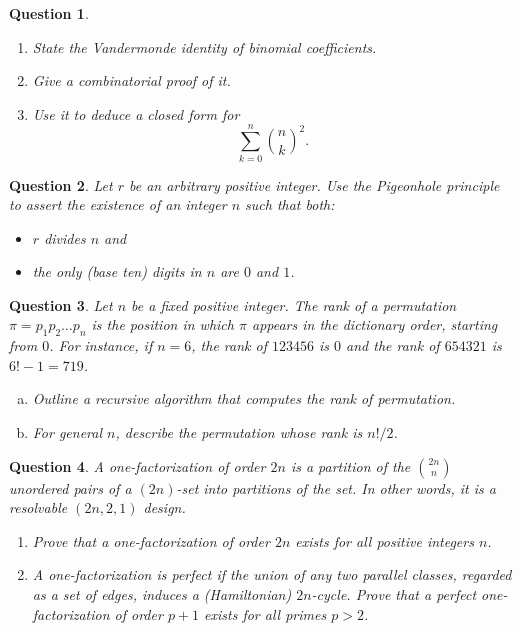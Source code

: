 \documentclass[12]{article}
\newtheorem{question}{Question}
\theoremstyle{definition}
\begin{document}
	\begin{question}
		\
		\begin{enumerate}
			\item State the Vandermonde identity of binomial coefficients.
			\item Give a combinatorial proof of it.
			\item Use it to deduce a closed form for
			$$\sum_{k=0}^n {n \choose k}^2.$$
		\end{enumerate}
	\end{question}

	\begin{question}
		Let $r$ be an arbitrary positive integer.  Use the Pigeonhole principle to assert the existence of an integer $n$ such that both:
		\begin{itemize}
			\item $r$ divides $n$ and
			\item the only (base ten) digits in $n$ are $0$ and $1$.
		\end{itemize}
	\end{question}

	\begin{question}
		Let $n$ be a fixed positive integer.  The rank of a permutation $\pi = p_1p_2\ldots p_n$ is the position in which $\pi$ appears in the dictionary order, starting from $0$.  For instance, if $n=6$, the rank of $123456$ is $0$ and the rank of $654321$ is $6!-1 = 719$.
		\begin{enumerate}[a)]
			\item Outline a recursive algorithm that computes the rank of permutation.
			\item For general $n$, describe the permutation whose rank is $n!/2$.
		\end{enumerate}
	\end{question}

	\begin{question}
		A one-factorization of order $2n$ is a partition of the ${2n \choose n}$ unordered pairs of a $(2n)$-set into partitions of the set.  In other words, it is a resolvable $(2n,2,1)$ design.
		\begin{enumerate}
			\item Prove that a one-factorization of order $2n$ exists for all positive integers $n$.
			\item A one-factorization is perfect if the union of any two parallel classes, regarded as a set of edges, induces a (Hamiltonian) $2n$-cycle.  Prove that a perfect one-factorization of order $p+1$ exists for all primes $p > 2$.
		\end{enumerate}
	\end{question}
\end{document}
